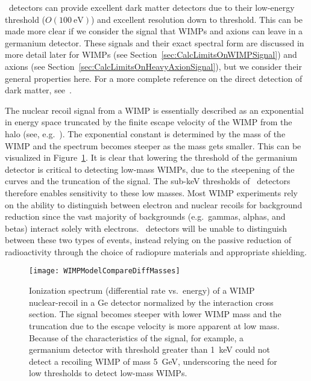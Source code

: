 	
	
	\ppc~detectors can provide excellent dark matter detectors due to their low-energy threshold ($O(100~\text{eV})$) and excellent resolution down to threshold.  This can be made more clear if we consider the signal that WIMPs and axions can leave in a germanium detector.  These signals and their exact spectral form are discussed in more detail later for WIMPs (see Section~\ref{sec:CalcLimitsOnWIMPSignal}) and axions (see Section~\ref{sec:CalcLimitsOnHeavyAxionSignal}), but we consider their general properties here.  For a more complete reference on the direct detection of dark matter, see~\cite{Gaitskell:2004fk}.
	
	The nuclear recoil signal from a WIMP is essentially described as an exponential in energy space truncated by the finite escape velocity of the WIMP from the halo (see, e.g.~\cite{Jun96, Lew96}).  The exponential constant is determined by the mass of the WIMP and the spectrum becomes steeper as the mass gets smaller.  This can be visualized in Figure~\ref{fig:WIMPDiffMasses}.  It is clear that lowering the threshold of the germanium detector is critical to detecting low-mass WIMPs, due to the steepening of the curves and the truncation of the signal.  The sub-keV thresholds of \ppc~detectors therefore enables sensitivity to these low masses.  Most WIMP experiments rely on the ability to distinguish between electron and nuclear recoils for background reduction since the vast majority of backgrounds (e.g.~gammas, alphas, and betas) interact solely with electrons.  \ppc~detectors will be unable to distinguish between these two types of events, instead relying on the passive reduction of radioactivity through the choice of radiopure materials and appropriate shielding.
	
			\begin{figure}
				\centering
				\texttt{[image: WIMPModelCompareDiffMasses]}
				\caption[Ionization spectrum of a WIMP nuclear-recoil in a Ge detector.]
				{Ionization spectrum (differential rate vs.~energy) of a WIMP
				nuclear-recoil in a Ge detector normalized by the interaction cross section.
				The signal becomes steeper with lower WIMP mass and the truncation due to the
				escape velocity is more apparent at low mass.  Because of the characteristics
				of the signal, for example, a germanium
				  detector with threshold greater than 1~keV could not detect a recoiling WIMP of mass 5~GeV, underscoring
				  the need for low thresholds to detect low-mass WIMPs.}
				\label{fig:WIMPDiffMasses}
			\end{figure}

